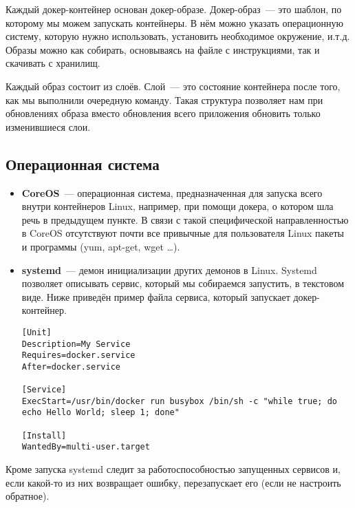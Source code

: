 	Каждый докер-контейнер основан докер-образе. Докер-образ~--- это шаблон, по которому мы можем запускать контейнеры. В нём можно указать операционную систему, которую нужно использовать, установить необходимое окружение, и.т.д. Образы можно как собирать, основываясь на файле с инструкциями, так и скачивать с хранилищ.
	
	Каждый образ состоит из слоёв. Слой~--- это состояние контейнера после того, как мы выполнили очередную команду. Такая структура позволяет нам при обновлениях образа вместо обновления всего приложения обновить только изменившиеся слои.
\subsection{Операционная система}
\begin{itemize}

	\item {\bf CoreOS}~--- операционная система, предназначенная для запуска всего внутри контейнеров Linux, например, при помощи докера, о котором шла речь в предыдущем пункте. В связи с такой специфической направленностью в CoreOS отсутствуют почти все привычные для пользователя Linux пакеты и программы (yum, apt-get, wget \dots).
	
	\item {\bf systemd}~--- демон инициализации других демонов в Linux. Systemd позволяет описывать сервис, который мы собираемся запустить, в текстовом виде. Ниже приведён пример файла сервиса, который запускает докер-контейнер.
\begin{lstlisting}
[Unit]
Description=My Service
Requires=docker.service
After=docker.service

[Service]	
ExecStart=/usr/bin/docker run busybox /bin/sh -c "while true; do echo Hello World; sleep 1; done"

[Install]
WantedBy=multi-user.target
\end{lstlisting}
\end{itemize}
	Кроме запуска systemd следит за работоспособностью запущенных сервисов и, если какой-то из них возвращает ошибку, перезапускает его (если не настроить обратное).
